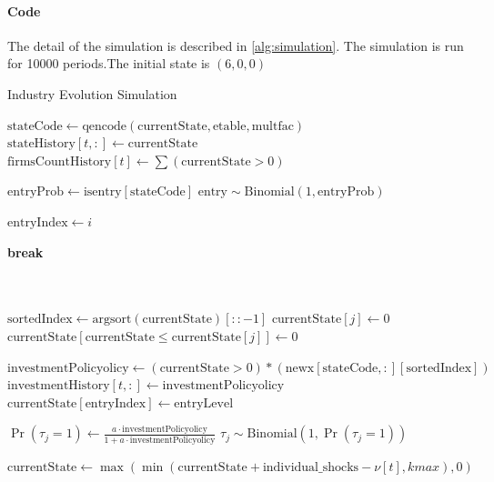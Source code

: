 \documentclass[12pt]{article}[margin=1in]
\begin{document}
\paragraph{Code} The detail of the simulation is described in \ref{alg:simulation}. The simulation is run for 10000 periods.The initial state is $(6,0,0)$
\begin{algorithm}
    \caption{Industry Evolution Simulation}
    \begin{algorithmic}[1]
        \State $\text{stateCode} \gets \text{qencode}(\text{currentState}, \text{etable}, \text{multfac})$
        \State $\text{stateHistory}[t, :] \gets \text{currentState}$
        \State $\text{firmsCountHistory}[t] \gets \sum (\text{currentState} > 0)$

        \State $\text{entryProb} \gets \text{isentry}[\text{stateCode}]$
        \State $\text{entry} \sim \text{Binomial}(1, \text{entryProb})$

        \State $\text{entryIndex} \gets i$
        \EndIf

        \State \textbf{break}
        \EndIf
        \EndFor

        \\
        \\
        \State $\text{sortedIndex} \gets \text{argsort} (\text{currentState})[::-1]$
        \State $\text{currentState}[j] \gets 0$
        \State $\text{currentState}[\text{currentState} \leq \text{currentState}[j]] \gets 0$
        \EndIf
        \EndFor

        \State $\text{investmentPolicyolicy} \gets (\text{currentState} > 0) * (\text{newx}[\text{stateCode}, :][\text{sortedIndex}])$
        \State $\text{investmentHistory}[t, :] \gets \text{investmentPolicyolicy}$
        \State $\text{currentState}[\text{entryIndex}] \gets \text{entryLevel}$
        \EndIf

        \State $\Pr(\tau_j = 1) \gets \frac{a \cdot \text{investmentPolicyolicy}}{1 + a \cdot \text{investmentPolicyolicy}}$
        \State $\tau_j \sim \text{Binomial}(1, \Pr(\tau_j = 1))$

        \State $\text{currentState} \gets \max(\min(\text{currentState} + \text{individual\_shocks} - \nu[t], kmax), 0)$
        \EndFor
    \end{algorithmic}
    \label{alg:simulation}
\end{algorithm}
\end{document}
